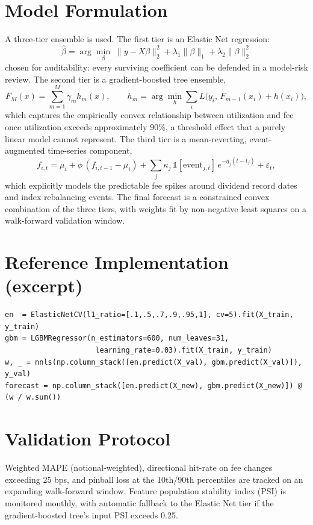 \documentclass[11pt]{report}
\begin{document}
\section{Model Formulation}
A three-tier ensemble is used. The first tier is an Elastic Net regression:
\begin{equation}
\hat\beta = \arg\min_{\beta}\; \lVert y - X\beta \rVert_2^2 + \lambda_1 \lVert \beta \rVert_1 + \lambda_2 \lVert \beta \rVert_2^2
\end{equation}
chosen for auditability: every surviving coefficient can be defended in a model-risk review.
The second tier is a gradient-boosted tree ensemble,
\begin{equation}
F_M(x) = \sum_{m=1}^{M} \gamma_m h_m(x), \qquad h_m = \arg\min_h \sum_{i} L\big(y_i,\, F_{m-1}(x_i) + h(x_i)\big),
\end{equation}
which captures the empirically convex relationship between utilization and fee once utilization
exceeds approximately 90\%, a threshold effect that a purely linear model cannot represent. The third
tier is a mean-reverting, event-augmented time-series component,
\begin{equation}
f_{i,t} = \mu_i + \phi\,(f_{i,t-1} - \mu_i) + \sum_j \kappa_j \, \mathbb{1}[\text{event}_{j,t}]\, e^{-\eta_j (t - t_j)} + \varepsilon_t,
\end{equation}
which explicitly models the predictable fee spikes around dividend record dates and index
rebalancing events. The final forecast is a constrained convex combination of the three tiers, with
weights fit by non-negative least squares on a walk-forward validation window.

\section{Reference Implementation (excerpt)}
\begin{lstlisting}
en  = ElasticNetCV(l1_ratio=[.1,.5,.7,.9,.95,1], cv=5).fit(X_train, y_train)
gbm = LGBMRegressor(n_estimators=600, num_leaves=31,
                     learning_rate=0.03).fit(X_train, y_train)
w, _ = nnls(np.column_stack([en.predict(X_val), gbm.predict(X_val)]), y_val)
forecast = np.column_stack([en.predict(X_new), gbm.predict(X_new)]) @ (w / w.sum())
\end{lstlisting}

\section{Validation Protocol}
Weighted MAPE (notional-weighted), directional hit-rate on fee changes exceeding 25 bps, and pinball
loss at the 10th/90th percentiles are tracked on an expanding walk-forward window. Feature population
stability index (PSI) is monitored monthly, with automatic fallback to the Elastic Net tier if the
gradient-boosted tree's input PSI exceeds 0.25.
\end{document}
